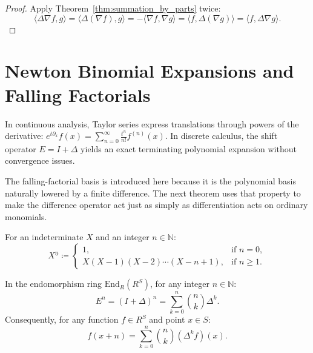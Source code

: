 \begin{proof}
Apply Theorem~\ref{thm:summation_by_parts} twice:
\begin{equation}
\langle \Delta\nabla f, g \rangle = \langle \Delta(\nabla f), g \rangle = - \langle \nabla f, \nabla g \rangle = \langle f, \Delta(\nabla g) \rangle = \langle f, \Delta\nabla g \rangle.
\end{equation}
\end{proof}

\section{Newton Binomial Expansions and Falling Factorials}

In continuous analysis, Taylor series express translations through powers of the derivative: $e^{t \partial_x} f(x) = \sum_{n=0}^\infty \frac{t^n}{n!} f^{(n)}(x)$. In discrete calculus, the shift operator $E = I + \Delta$ yields an exact terminating polynomial expansion without convergence issues.

The falling-factorial basis is introduced here because it is the polynomial
basis naturally lowered by a finite difference. The next theorem uses that
property to make the difference operator act just as simply as differentiation
acts on ordinary monomials.

\begin{definition}
For an indeterminate $X$ and an integer $n \in \mathbb{N}$:
\begin{equation}
X^{\underline{n}} \coloneqq \begin{cases}
1, & \text{if } n = 0, \\
X (X - 1) (X - 2) \cdots (X - n + 1), & \text{if } n \ge 1.
\end{cases}
\end{equation}
\end{definition}

\begin{theorem}
\label{thm:newton_binomial}
In the endomorphism ring $\mathrm{End}_R(R^S)$, for any integer $n \in \mathbb{N}$:
\begin{equation}
E^n = (I + \Delta)^n = \sum_{k=0}^n \binom{n}{k} \Delta^k.
\end{equation}
Consequently, for any function $f \in R^S$ and point $x \in S$:
\begin{equation}
f(x+n) = \sum_{k=0}^n \binom{n}{k} (\Delta^k f)(x).
\end{equation}
\end{theorem}

